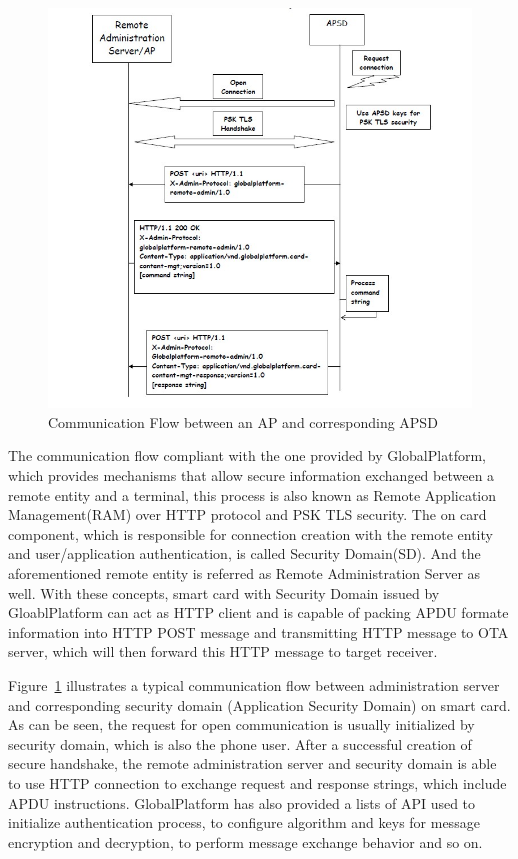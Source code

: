 \begin{figure}
	\centering
	\includegraphics[width=1.2\textwidth]{apsd.jpg}
		\caption{Communication Flow between an AP and corresponding APSD\cite{ramGP}}
	\label{fig:apsd}
\end{figure}
The communication flow compliant with the one provided by GlobalPlatform, which provides mechanisms that allow secure information exchanged between a remote entity and a terminal, this process is also known as Remote Application Management(RAM) over HTTP protocol and PSK TLS security. The on card component, which is responsible for connection creation with the remote entity and user/application authentication, is called Security Domain(SD). And the aforementioned remote entity  is  referred as Remote Administration Server as well. With these concepts, smart card with Security Domain issued  by GloablPlatform can act as HTTP client and is capable of packing APDU formate information into HTTP POST message and transmitting HTTP message to OTA server, which will then forward this HTTP message to target receiver.\cite{ramGP}
 
Figure~\ref{fig:apsd} illustrates a typical communication flow between administration server and corresponding security domain (Application Security Domain) on smart card. As can be seen, the request for open communication is usually initialized by security domain, which is also the phone user. After a successful creation of secure handshake, the remote administration server and security domain is able to use HTTP connection to exchange request and response strings, which include APDU instructions. GlobalPlatform has also provided  a lists of API used to initialize authentication process, to configure algorithm and keys for message  encryption and decryption, to perform message exchange  behavior and so on.

